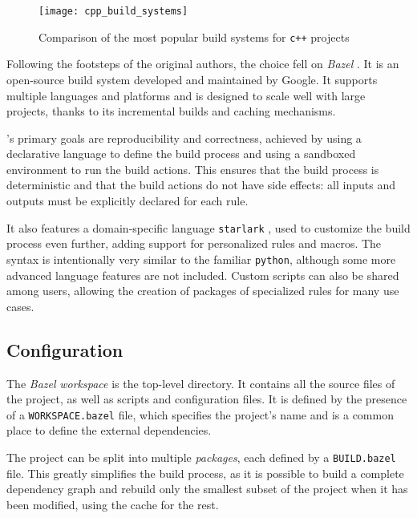 \begin{figure}[h]
    \centering
    \texttt{[image: cpp\_build\_systems]}
    \caption{Comparison of the most popular build systems for \texttt{c++} projects \cite{art:cpp-build-system}}\label{fig:cpp_build_systems}
\end{figure}

Following the footsteps of the original authors, the choice fell on \textit{Bazel} \cite{repo:bazel}.
It is an open-source build system developed and maintained by Google.
It supports multiple languages and platforms and is designed to scale well with large projects, thanks to its incremental builds and caching mechanisms.

\bazel's primary goals are reproducibility and correctness, achieved by using a declarative language to define the build process and using a sandboxed environment to run the build actions.
This ensures that the build process is deterministic and that the build actions do not have side effects: all inputs and outputs must be explicitly declared for each rule.

It also features a domain-specific language \texttt{starlark} \cite{repo:starlark}, used to customize the build process even further, adding support for personalized rules and macros.
The syntax is intentionally very similar to the familiar \texttt{python}, although some more advanced language features are not included.
Custom scripts can also be shared among users, allowing the creation of packages of specialized rules for many use cases.

\subsection*{Configuration}

The \textit{Bazel} \textit{workspace} is the top-level directory.
It contains all the source files of the project, as well as scripts and configuration files.
It is defined by the presence of a \texttt{WORKSPACE.bazel} file, which specifies the project's name and is a common place to define the external dependencies.



The project can be split into multiple \textit{packages}, each defined by a \texttt{BUILD.bazel} file.
This greatly simplifies the build process, as it is possible to build a complete dependency graph and rebuild only the smallest subset of the project when it has been modified, using the cache for the rest.

